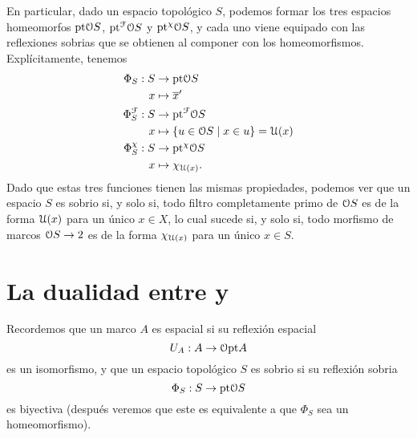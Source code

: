 En particular, dado un espacio topológico $S$, podemos formar
los tres espacios homeomorfos
$\pt\cal OS$, $\pt^{\cal F}\cal OS$ y $\pt^\chi \cal OS$,
y cada uno viene equipado con las reflexiones sobrias
que se obtienen al componer con los homeomorfismos.
Explícitamente, tenemos
\begin{align*}
    \Phi_S:S&\to \pt\cal OS \\
    x&\mapsto \ol{x}' \\
    \Phi^{\cal F}_S:S&\to\pt^{\cal F}\cal OS \\
    x&\mapsto \{u\in\cal OS \mid x\in u\} = \cal U(x) \\
    \Phi^\chi_S:S&\to\pt^\chi\cal OS \\
    x&\mapsto \chi_{\cal U(x)}.
\end{align*}
Dado que estas tres funciones tienen las mismas
propiedades, podemos ver que un espacio $S$ es sobrio si,
y solo si, todo filtro completamente primo de $\cal OS$
es de la forma $\cal U(x)$ para un único $x\in X$,
lo cual sucede si, y solo si, todo morfismo de marcos
$\cal OS\to 2$ es de la forma $\chi_{\cal U(x)}$ para un único
$x\in S$.


\section{La dualidad entre  y }

Recordemos que un marco $A$ es espacial si su reflexión espacial
\[
    U_A:A\to\cal O\pt A
\]
es un isomorfismo, y que un espacio topológico $S$ es sobrio
si su reflexión sobria
\[
    \Phi_S:S\to\pt\cal OS
\]
es biyectiva (después veremos que este es equivalente a que
$\Phi_S$ sea un homeomorfismo).

